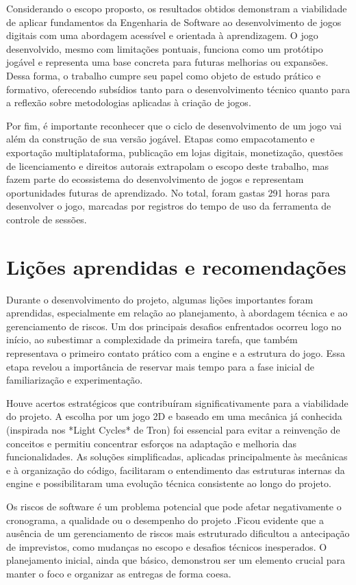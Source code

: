 Considerando o escopo proposto, os resultados obtidos demonstram a viabilidade de aplicar fundamentos da Engenharia de Software ao desenvolvimento de jogos digitais com uma abordagem acessível e orientada à aprendizagem. O jogo desenvolvido, mesmo com limitações pontuais, funciona como um protótipo jogável e representa uma base concreta para futuras melhorias ou expansões. Dessa forma, o trabalho cumpre seu papel como objeto de estudo prático e formativo, oferecendo subsídios tanto para o desenvolvimento técnico quanto para a reflexão sobre metodologias aplicadas à criação de jogos.

Por fim, é importante reconhecer que o ciclo de desenvolvimento de um jogo vai além da construção de sua versão jogável. Etapas como empacotamento e exportação multiplataforma, publicação em lojas digitais, monetização, questões de licenciamento e direitos autorais extrapolam o escopo deste trabalho, mas fazem parte do ecossistema do desenvolvimento de jogos e representam oportunidades futuras de aprendizado. No total, foram gastas 291 horas para desenvolver o jogo, marcadas por registros do tempo de uso da ferramenta de controle de sessões.


\section{Lições aprendidas e recomendações}

Durante o desenvolvimento do projeto, algumas lições importantes foram aprendidas, especialmente em relação ao planejamento, à abordagem técnica e ao gerenciamento de riscos. Um dos principais desafios enfrentados ocorreu logo no início, ao subestimar a complexidade da primeira tarefa, que também representava o primeiro contato prático com a engine e a estrutura do jogo. Essa etapa revelou a importância de reservar mais tempo para a fase inicial de familiarização e experimentação.

Houve acertos estratégicos que contribuíram significativamente para a viabilidade do projeto. A escolha por um jogo 2D e baseado em uma mecânica já conhecida (inspirada nos *Light Cycles* de Tron) foi essencial para evitar a reinvenção de conceitos e permitiu concentrar esforços na adaptação e melhoria das funcionalidades. As soluções simplificadas, aplicadas principalmente às mecânicas e à organização do código, facilitaram o entendimento das estruturas internas da engine e possibilitaram uma evolução técnica consistente ao longo do projeto.

Os riscos de software é um problema potencial que pode afetar negativamente o cronograma, a qualidade ou o desempenho do projeto \cite{pressman2016engenharia} \cite{pmbok2017}.Ficou evidente que a ausência de um gerenciamento de riscos mais estruturado dificultou a antecipação de imprevistos, como mudanças no escopo e desafios técnicos inesperados. O planejamento inicial, ainda que básico, demonstrou ser um elemento crucial para manter o foco e organizar as entregas de forma coesa.

